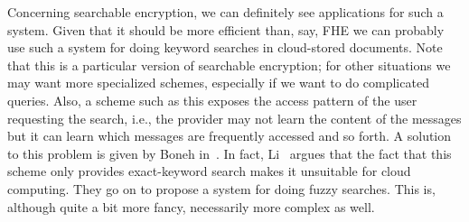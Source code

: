 \documentclass[11pt, a4paper]{article}
\begin{document}
Concerning searchable encryption, we can definitely see applications for such a system.
Given that it should be more efficient than, say, FHE we can probably use such a system for doing keyword searches in cloud-stored documents.
Note that this is a particular version of searchable encryption; for other situations we may want more specialized schemes, especially if we want to do complicated queries.
Also, a scheme such as this exposes the access pattern of the user requesting the search, i.e., the provider may not learn the content of the messages but it can learn which messages are frequently accessed and so forth.
A solution to this problem is given by Boneh in~\cite{boneh2007public}.
In fact, Li~\cite{li2010fuzzy} argues that the fact that this scheme only provides exact-keyword search makes it unsuitable for cloud computing.
They go on to propose a system for doing fuzzy searches. This is, although quite a bit more fancy, necessarily more complex as well.


\end{document}
